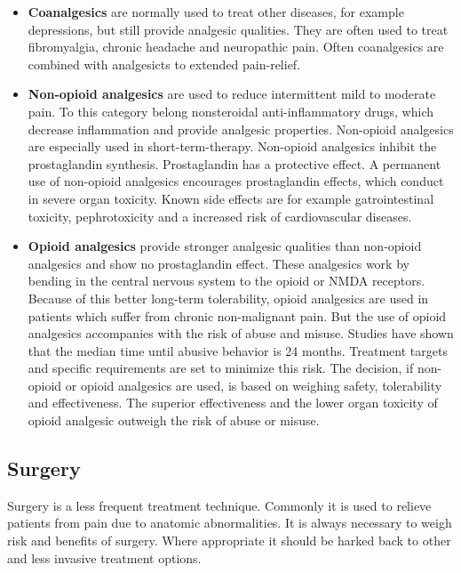 \begin{itemize}
\item \textbf{Coanalgesics} are normally used to treat other diseases, for example depressions, but still provide analgesic qualities. They are often used to treat fibromyalgia, chronic headache and neuropathic pain. Often coanalgesics are combined with analgesicts to extended pain-relief. \cite{marcus2009}

\item \textbf{Non-opioid analgesics} are used to reduce intermittent mild to moderate pain. To this category belong nonsteroidal anti-inflammatory drugs, which decrease inflammation and provide analgesic properties. Non-opioid analgesics are especially used in short-term-therapy. Non-opioid analgesics inhibit the prostaglandin synthesis. Prostaglandin has a protective effect. A permanent use of non-opioid analgesics encourages prostaglandin effects, which conduct in severe organ toxicity. Known side effects are for example gatrointestinal toxicity, pephrotoxicity and a increased risk of cardiovascular diseases. \cite{marcus2009,stein2007}

\item \textbf{Opioid analgesics} provide stronger analgesic qualities than non-opioid analgesics and show no prostaglandin effect. These analgesics work by bending in the central nervous system to the opioid or NMDA receptors.  Because of this better long-term tolerability, opioid analgesics are used in patients which suffer from chronic non-malignant pain. But the use of opioid analgesics accompanies with the risk of abuse and misuse. Studies have shown that the median time until abusive behavior is 24 months. Treatment targets and specific requirements are set to minimize this risk. \cite{marcus2009,stein2007}
The decision, if non-opioid or opioid analgesics are used, is based on weighing safety, tolerability and effectiveness. The superior effectiveness and the lower organ toxicity of opioid analgesic outweigh the risk of abuse or misuse. \cite{marcus2009} 
\end{itemize}

\subsection{Surgery}
Surgery is a less frequent treatment technique. Commonly it is used to relieve patients from pain due to anatomic abnormalities. \cite{marcus2009,pope2017} %
It is always necessary to weigh risk and benefits of surgery. Where appropriate it should be harked back to other and less invasive treatment options. \cite{pope2017}

